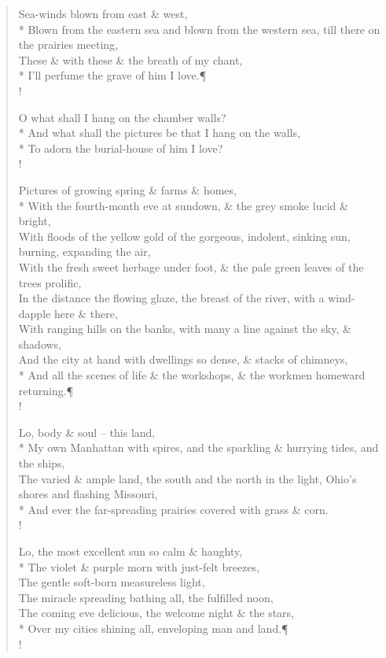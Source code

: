 \documentclass[MAIN]{subfiles}
\begin{document}
\begin{verse}
Sea-winds blown from east \& west,\\*
Blown from the eastern sea and blown from the western sea, till there on the prairies meeting,\\ 
These \& with these \& the breath of my chant,\\*
I'll perfume the grave of him I love.\P\\!

O what shall I hang on the chamber walls?\\*
And what shall the pictures be that I hang on the walls,\\*
To adorn the burial-house of him I love?\\!

Pictures of growing spring \& farms \& homes,\\*
With the fourth-month eve at sundown, \& the grey smoke lucid \& bright,\\ 
With floods of the yellow gold of the gorgeous, indolent, sinking sun, burning, expanding the air,\\ 
With the fresh sweet herbage under foot, \& the pale green leaves of the trees prolific,\\
In the distance the flowing glaze, the breast of the river, with a wind-dapple here \& there,\\
With ranging hills on the banks, with many a line against the sky, \& shadows,\\
And the city at hand with dwellings so dense, \& stacks of chimneys,\\*
And all the scenes of life \& the workshops, \& the workmen homeward returning.\P\\!

Lo, body \& soul -- this land,\\*
My own {\sc Manhattan} with spires, and the sparkling \& hurrying tides, and the ships,\\ 
The varied \& ample land, the south and the north in the light, {\sc Ohio}'s shores and flashing {\sc Missouri},\\*
And ever the far-spreading prairies covered with grass \& corn.\\!

Lo, the most excellent sun so calm \& haughty,\\*
The violet \& purple morn with just-felt breezes,\\
The gentle soft-born measureless light,\\
The miracle spreading bathing all, the fulfilled noon,\\
The coming eve delicious, the welcome night \& the stars,\\*
Over my cities shining all, enveloping man and land.\P\\!


\end{verse}
\end{document}
